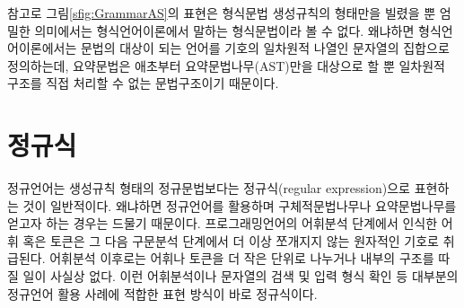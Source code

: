 참고로 그림\;\ref{sfig:GrammarAS}의 표현은 형식문법 생성규칙의
형태만을 빌렸을 뿐 엄밀한 의미에서는 형식언어이론에서 말하는
형식문법이라 볼 수 없다. 왜냐하면 형식언어이론에서는 문법의
대상이 되는 언어를 기호의 일차원적 나열인 문자열의 집합으로
정의하는데, 요약문법은 애초부터 요약문법나무(AST)만을 대상으로
할 뿐 일차원적 구조를 직접 처리할 수 없는 문법구조이기 때문이다.

\section{정규식}
\label{sec:regex}
정규언어는 생성규칙 형태의 정규문법보다는
%
%
정규식(regular expression)으로 표현하는 것이
일반적이다. 왜냐하면 정규언어를 활용하며 구체적문법나무나 요약문법나무를
얻고자 하는 경우는 드물기 때문이다. 프로그래밍언어의 어휘분석 단계에서
인식한 어휘 혹은 토큰은 그 다음 구문분석 단계에서 더 이상 쪼개지지 않는
원자적인 기호로 취급된다. 어휘분석 이후로는 어휘나 토큰을 더 작은 단위로
나누거나 내부의 구조를 따질 일이 사실상 없다. 이런 어휘분석이나 문자열의
검색 및 입력 형식 확인 등 대부분의 정규언어 활용 사례에 적합한 표현 방식이
바로 정규식이다.

